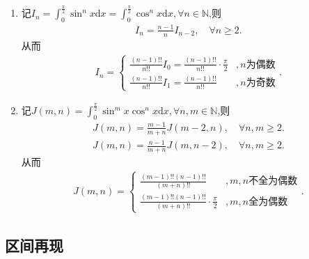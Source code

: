 \documentclass[../../main.tex]{subfiles}%
\begin{document}
\begin{theorem}[点火公式]\label{theorem:点火公式}
\begin{enumerate}
\item 记$I_n=\int_0^{\frac{\pi}{2}}\sin^n x\mathrm{d}x=\int_0^{\frac{\pi}{2}}\cos^n x\mathrm{d}x,\forall n\in \mathbb{N}$,则
\begin{align*}
I_n=\frac{n-1}{n}I_{n-2},\quad \forall n\geqslant 2.
\end{align*}
从而
\begin{align}\label{eq:点火公式1}
I_n=
\begin{cases}
\frac{(n-1)!!}{n!!}I_0=\frac{(n-1)!!}{n!!}\cdot \frac{\pi}{2}&,n\text{为偶数}\\
\frac{(n-1)!!}{n!!}I_1=\frac{(n-1)!!}{n!!}&,n\text{为奇数}
\end{cases}.
\end{align}

\item 记$J(m,n)=\int_0^{\frac{\pi}{2}}\sin^m x\cos^n x\mathrm{d}x,\forall n,m\in \mathbb{N}$,则
\begin{align*}
J(m,n)=\frac{m-1}{m+n}J(m-2,n),\quad \forall n,m\geqslant 2.
\end{align*}
\begin{align*}
J(m,n)=\frac{n-1}{m+n}J(m,n-2),\quad \forall n,m\geqslant 2.
\end{align*}
从而
\begin{align}\label{eq:点火公式2}
J(m,n)=
\begin{cases}
\frac{(m-1)!!(n-1)!!}{(m+n)!!}&,m,n\text{不全为偶数}\\
\frac{(m-1)!!(n-1)!!}{(m+n)!!}\cdot \frac{\pi}{2}&,m,n\text{全为偶数}
\end{cases}.
\end{align}

\end{enumerate}
\end{theorem}





\subsection{区间再现}
\end{document}
